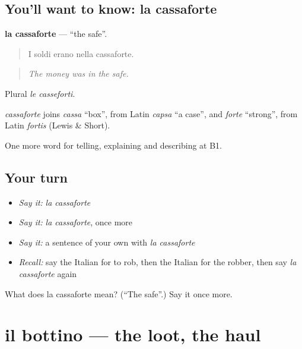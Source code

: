 \subsection*{You'll want to know: la cassaforte}
\textbf{la cassaforte} — \textquotedblleft{}the safe\textquotedblright{}.

\begin{quote}
I soldi erano nella cassaforte.
\end{quote}

\begin{quote}
\emph{The money was in the safe.}
\end{quote}

Plural \emph{le casseforti}.

\begin{cousinweb}
\emph{cassaforte} joins \emph{cassa} \textquotedblleft{}box\textquotedblright{}, from Latin \emph{capsa} \textquotedblleft{}a case\textquotedblright{}, and \emph{forte} \textquotedblleft{}strong\textquotedblright{}, from Latin \emph{fortis} (Lewis \& Short).
\end{cousinweb}

\begin{grammarlens}[title={What you've built}]
One more word for telling, explaining and describing at B1.
\end{grammarlens}

\subsection*{Your turn}
\begin{itemize}
\raggedright
  \item \emph{Say it:} \emph{la cassaforte}
  \item \emph{Say it:} \emph{la cassaforte}, once more
  \item \emph{Say it:} a sentence of your own with \emph{la cassaforte}
  \item \emph{Recall:} say the Italian for to rob, then the Italian for the robber, then say \emph{la cassaforte} again
\end{itemize}

\begin{tcolorbox}[breakable,colback=teal!4,colframe=teal!35!black,title={Before you move on}]
What does la cassaforte mean? (\textquotedblleft{}The safe\textquotedblright{}.) Say it once more.
\end{tcolorbox}
\section[il bottino]{il bottino — the loot, the haul}

